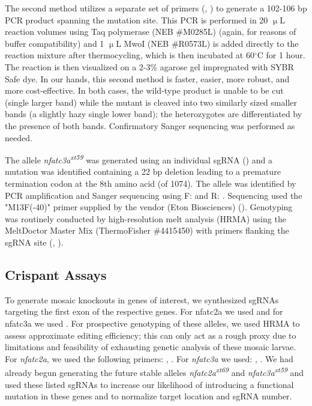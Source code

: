 The second method utilizes a separate set of primers (, ) to generate a 102-106 bp PCR product spanning the mutation site. This PCR is performed in 20 $\upmu$L reaction volumes using Taq polymerase (NEB \#M0285L) (again, for reasons of buffer compatibility) and 1 $\upmu$L MwoI (NEB \#R0573L) is added directly to the reaction mixture after thermocycling, which is then incubated at 60$^{\circ}$C for 1 hour. The reaction is then visualized on a 2-3\% agarose gel impregnated with SYBR Safe dye. In our hands, this second method is faster, easier, more robust, and more cost-effective. In both cases, the wild-type product is unable to be cut (single larger band) while the mutant is cleaved into two similarly sized smaller bands (a slightly hazy single lower band); the heterozygotes are differentiated by the presence of both bands. Confirmatory Sanger sequencing was performed as needed.

The allele \textit{nfatc3a\textsuperscript{xt59}} was generated using an individual sgRNA () and a mutation was identified containing a 22 bp deletion leading to a premature termination codon at the 8th amino acid (of 1074). The allele was identified by PCR amplification and Sanger sequencing using F:  and R: . Sequencing used the "M13F(-40)" primer supplied by the vendor (Eton Biosciences) (). Genotyping was routinely conducted by high-resolution melt analysis (HRMA) using the MeltDoctor Master Mix (ThermoFisher \#4415450) with primers flanking the sgRNA site (, ). 

\subsection{Crispant Assays}\label{crispants}

To generate mosaic knockouts in genes of interest, we synthesized sgRNAs targeting the first exon of the respective genes. For nfatc2a we used  and for nfatc3a we used . For prospective genotyping of these alleles, we used HRMA to assess approximate editing efficiency; this can only act as a rough proxy due to limitations and feasibility of exhausting genetic analysis of these mosaic larvae. For \textit{nfatc2a}, we used the following primers: , . For \textit{nfatc3a} we used: , . We had already begun generating the future stable alleles \textit{nfatc2a\textsuperscript{xt69}} and \textit{nfatc3a\textsuperscript{xt59}} and used these listed sgRNAs to increase our likelihood of introducing a functional mutation in these genes and to normalize target location and sgRNA number.

